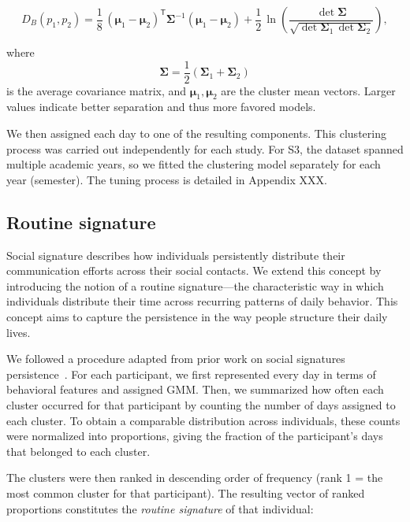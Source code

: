 \documentclass[pdflatex,sn-vancouver,Numbered]{bst/sn-jnl}%
\theoremstyle{thmstyleone}%
\theoremstyle{thmstyletwo}%
\theoremstyle{thmstylethree}%
\begin{document}
\[
D_B(p_1,p_2)
    = \frac{1}{8}\,
      (\boldsymbol{\mu}_1 - \boldsymbol{\mu}_2)^{\mathsf T}
      \boldsymbol{\Sigma}^{-1}
      (\boldsymbol{\mu}_1 - \boldsymbol{\mu}_2)
      + \frac{1}{2}\,
        \ln\!\left(
          \frac{\det\boldsymbol{\Sigma}}
               {\sqrt{\det\boldsymbol{\Sigma}_1\,\det\boldsymbol{\Sigma}_2}}
        \right),
\]

where
\[
\boldsymbol{\Sigma} = \frac{1}{2} \left( \boldsymbol{\Sigma}_1 + \boldsymbol{\Sigma}_2 \right)
\]
is the average covariance matrix, and \(\boldsymbol{\mu}_1,\boldsymbol{\mu}_2\) are the cluster mean vectors. Larger values indicate better separation and thus more favored models.

We then assigned each day to one of the resulting components. This clustering process was carried out independently for each study. For S3, the dataset spanned multiple academic years, so we fitted the clustering model separately for each year (semester). The tuning process is detailed in Appendix XXX.


\subsection*{Routine signature}\label{sec:methods:signature}  

Social signature describes how individuals persistently distribute their communication efforts across their social contacts. We extend this concept by introducing the notion of a routine signature—the characteristic way in which individuals distribute their time across recurring patterns of daily behavior. This concept aims to capture the persistence in the way people structure their daily lives.

We followed a procedure adapted from prior work on social signatures persistence~\cite{saramaki2014persistence, heydari2018multichannel}. 
For each participant, we first represented every day in terms of behavioral features and assigned GMM. Then, we summarized how often each cluster occurred for that participant by counting the number of days assigned to each cluster. 
To obtain a comparable distribution across individuals, these counts were normalized into proportions, giving the fraction of the participant’s days that belonged to each cluster.  

The clusters were then ranked in descending order of frequency (rank 1 = the most common cluster for that participant). 
The resulting vector of ranked proportions constitutes the \textit{routine signature} of that individual:
\end{document}
